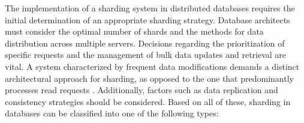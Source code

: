 \noindent The implementation of a sharding system in distributed databases requires the initial determination of an appropriate sharding strategy. Database architects must consider the optimal number of shards and the methods for data distribution across multiple servers. Decisions regarding the prioritization of specific requests and the management of bulk data updates and retrieval are vital. A system characterized by frequent data modifications demands a distinct architectural approach for sharding, as opposed to the one that predominantly processes read requests \cite{abdelhafiz2020distributed}. Additionally, factors such as data replication and consistency strategies should be considered. Based on all of these, sharding in databases can be classified into one of the following types: \\

